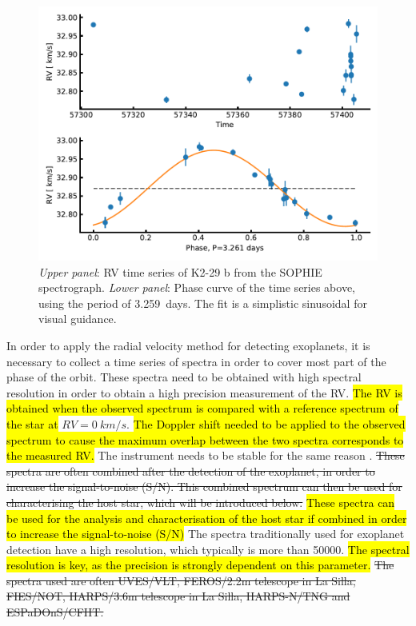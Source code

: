 \begin{figure}[htpb!]
    \centering
    \includegraphics[width=1.0\linewidth]{figures/RVmethod.pdf}
    \caption{\emph{Upper panel}: RV time series of K2-29 b from the SOPHIE spectrograph.
             \emph{Lower panel}: Phase curve of the time series above, using the period of
             \SI{3.259}{days}. The fit is a simplistic sinusoidal for visual guidance.}
    \label{fig:rvmethod}
\end{figure}

In order to apply the radial velocity method for detecting exoplanets, it is necessary to collect a
time series of spectra in order to cover most part of the phase of the orbit. These spectra need to
be obtained with high spectral resolution in order to obtain a high precision measurement of the RV.
\hl{The RV is obtained when the observed spectrum is compared with a reference spectrum of the star
at} $RV=\SI{0}{km/s}$. \hl{The Doppler shift needed to be applied to the observed spectrum to cause
the maximum overlap between the two spectra corresponds to the measured RV.} The instrument needs to
be stable for the same reason \citep[see e.g.][]{Bouchy2001}. \st{These spectra are often combined
after the detection of the exoplanet, in order to increase the signal-to-noise (S/N). This combined
spectrum can then be used for characterising the host star, which will be introduced below.}
\hl{These spectra can be used for the analysis and characterisation of the host star if combined in
order to increase the signal-to-noise (S/N)} The spectra traditionally used for exoplanet detection
have a high resolution, which typically is more than \num{50000}. \hl{The spectral resolution is
key, as the precision is strongly dependent on this parameter.} \st{The spectra used are often
UVES/VLT, FEROS/2.2m telescope in La Silla, FIES/NOT, HARPS/3.6m telescope in La Silla, HARPS-N/TNG
and ESPaDOnS/CFHT.}

